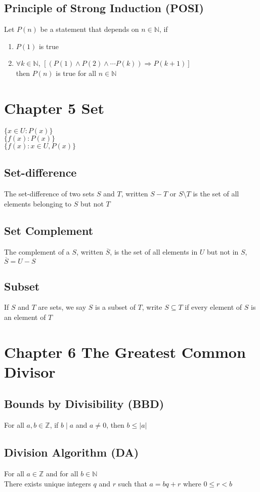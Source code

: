 \documentclass[12pt, letterpaper]{article}
\begin{document}
\subsection{Principle of Strong Induction (POSI)}
Let $P(n)$ be a statement that depends on $n \in \mathbb{N}$, if 
\begin{enumerate}
    \item $P(1)$ is true
    \item $\forall k \in \mathbb{N}$, $[(P(1)\wedge P(2)\wedge \cdots P(k)) \Rightarrow P(k+1)]$ \\
          then $P(n)$ is true for all $n \in \mathbb{N}$
\end{enumerate}

\section{Chapter 5 Set}
$\{x \in U : P(x) \}$ \\
$\{f(x) : P(x)\}$ \\
$\{f(x) : x \in U, P(x)\}$
\subsection{Set-difference}
The set-difference of two sets $S$ and $T$, written $S-T$ or $S \setminus T$ is the set of all elements belonging to $S$ but not $T$
\subsection{Set Complement}
The complement of a $S$, written $\overline{S}$, is the set of all elements in $U$ but not in $S$, $\overline{S} = U - S$
\subsection{Subset}
If $S$ and $T$ are sets, we say $S$ is a subset of $T$, write $S \subseteq T$ if every element of $S$ is an element of $T$

\section{Chapter 6 The Greatest Common Divisor}
\subsection{Bounds by Divisibility (BBD)}
For all $a,b \in \mathbb{Z}$, if $b \mid a$ and $a \neq 0$, then $b \leq |a|$
\subsection{Division Algorithm (DA)}
For all $a \in \mathbb{Z}$ and for all $b \in \mathbb{N}$ \\
There exists unique integers $q$ and $r$ such that $a = bq + r$ where $0 \leq r < b$
\end{document}
